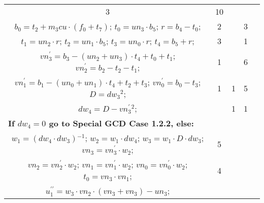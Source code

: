 \begin{tabular}{|c|cr|c|c|c|c|}
{} & 3 &  & 10 & \\
\multicolumn{3}{|R{340pt}|}{ 
$b_0=t_2+m_3cu \cdot (f_0+t_7)$;\hspace{4pt}
$t_0=un_3 \cdot b_5$;\hspace{4pt}
$r=b_4-t_0$;\hspace{4pt}
} & 2 &  & 3 & \\
\multicolumn{3}{|R{340pt}|}{ 
$t_1=un_2 \cdot r$;\hspace{4pt}
$t_2=un_1 \cdot b_5$;\hspace{4pt}
$t_3=un_0 \cdot r$;\hspace{4pt}
$t_4=b_5+r$;\hspace{4pt}
} & 3 &  & 1 & \\
\multicolumn{3}{|R{340pt}|}{ 
$vn^{\prime}_3=b_3-(un_2+un_3) \cdot t_4+t_0+t_1$;\hspace{4pt}
$vn^{\prime}_2=b_2-t_2-t_1$;\hspace{4pt}
} & 1 &  & 6 & \\
\multicolumn{3}{|R{340pt}|}{ 
$vn^{\prime}_1=b_1-(un_0+un_1) \cdot t_4+t_2+t_3$;\hspace{4pt}
$vn^{\prime}_0=b_0-t_3$;\hspace{4pt}
$D=dw_3{}^{2}$;\hspace{4pt}
} & 1 & 1 & 5 & \\
\multicolumn{3}{|R{340pt}|}{ 
$dw_4=D-vn^{\prime}_3{}^{2}$;\hspace{4pt}
} &  & 1 & 1 & \\
\multicolumn{3}{|l|}{ 
 \bf{If $dw_4 = 0$ go to Special GCD Case 1.2.2, else:} } &  &  &  & \\
\multicolumn{3}{|R{340pt}|}{ 
$w_1=(dw_4 \cdot dw_3){}^{-1}$;\hspace{4pt}
$w_2=w_1 \cdot dw_4$;\hspace{4pt}
$w_3=w_1 \cdot D \cdot dw_3$;\hspace{4pt}
$vn_3=vn^{\prime}_3 \cdot w_2$;\hspace{4pt}
} & 5 &  &  & \\
\multicolumn{3}{|R{340pt}|}{ 
$vn_2=vn^{\prime}_2 \cdot w_2$;\hspace{4pt}
$vn_1=vn^{\prime}_1 \cdot w_2$;\hspace{4pt}
$vn_0=vn^{\prime}_0 \cdot w_2$;\hspace{4pt}
$t_0=vn_3 \cdot vn_1$;\hspace{4pt}
} & 4 &  &  & \\
\multicolumn{3}{|R{340pt}|}{ 
$u^{\prime\prime}_1=w_3 \cdot vn_2 \cdot (vn_3+vn_3)-un_3$;\hspace{4pt}
}
\end{tabular}
